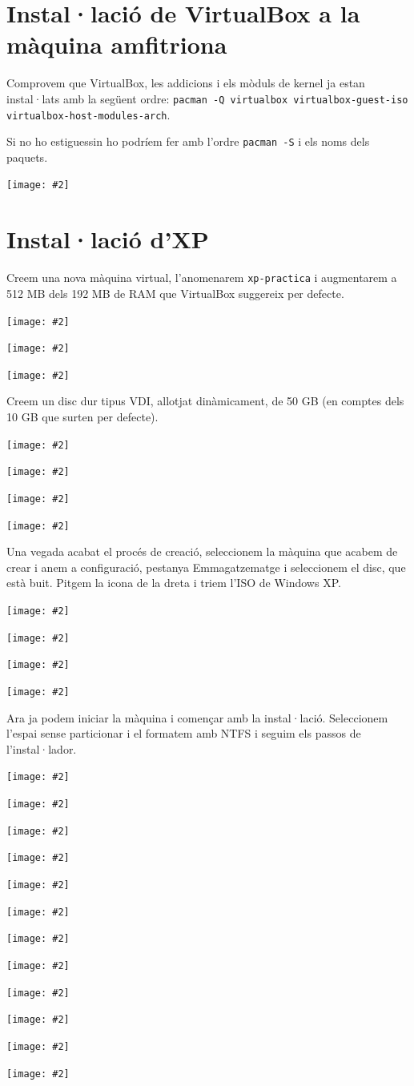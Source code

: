 \documentclass[a4paper,12pt]{article}
\newcommand{\mygraphic}[2][width=0.9\textwidth]{\begin{center}
		\centering\texttt{[image: \#2]}\par
\end{center}}
\begin{document}


\tableofcontents
\newpage

\section{Instal·lació de VirtualBox a la màquina amfitriona}

Comprovem que VirtualBox, les addicions i els mòduls de kernel ja estan instal·lats amb la següent ordre:
\texttt{pacman -Q virtualbox virtualbox-guest-iso virtualbox-host-modules-arch}.

Si no ho estiguessin ho podríem fer amb l'ordre \texttt{pacman -S} i els noms dels paquets.
\mygraphic{imatges/a0.png}

\newpage
\section{Instal·lació d'XP}
Creem una nova màquina virtual, l'anomenarem \texttt{xp-practica} i augmentarem a 512 MB dels 192 MB de RAM que VirtualBox suggereix per defecte.
\mygraphic{imatges/a1.png}
\mygraphic{imatges/a2.png}
\mygraphic{imatges/a3.png}

Creem un disc dur tipus VDI, allotjat dinàmicament, de 50 GB (en comptes dels 10 GB que surten per defecte).
\mygraphic{imatges/a4.png}
\mygraphic{imatges/a5.png}
\mygraphic{imatges/a6.png}
\mygraphic{imatges/a7.png}

Una vegada acabat el procés de creació, seleccionem la màquina que acabem de crear i anem a configuració, pestanya Emmagatzematge i seleccionem el disc, que està buit. Pitgem la icona de la dreta i triem l'ISO de Windows XP.
\mygraphic{imatges/a21.png}
\mygraphic{imatges/a22.png}
\mygraphic{imatges/a24.png}
\mygraphic{imatges/a25.png}

Ara ja podem iniciar la màquina i començar amb la instal·lació. Seleccionem l'espai sense particionar i el formatem amb NTFS i seguim els passos de l'instal·lador.
\mygraphic{imatges/b8.png}
\mygraphic{imatges/b9.png}
\mygraphic{imatges/b10.png}
\mygraphic[height=0.45\textheight]{imatges/b11.png}
\mygraphic[height=0.45\textheight]{imatges/b12.png}
\mygraphic[height=0.45\textheight]{imatges/b13.png}
\mygraphic[height=0.45\textheight]{imatges/b14.png}
\mygraphic[height=0.45\textheight]{imatges/b15.png}
\mygraphic[height=0.45\textheight]{imatges/b16.png}
\mygraphic[height=0.45\textheight]{imatges/b17.png}
\mygraphic[height=0.45\textheight]{imatges/b18.png}
\mygraphic[height=0.45\textheight]{imatges/b19.png}
\end{document}
